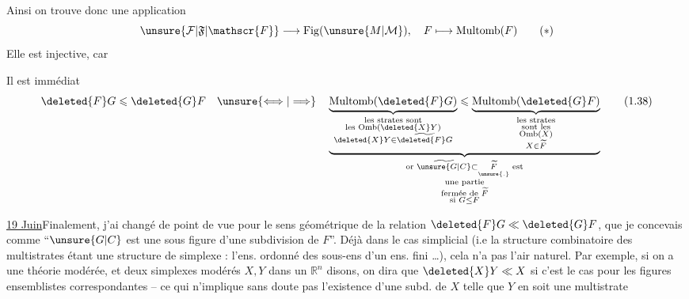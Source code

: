 
Ainsi on trouve donc une application
\[
 \unsure{\mathcal{F}|\mathfrak{F}|\mathscr{F}}\longrightarrow\mathrm{Fig}(\unsure{M|\mathcal{M}}),\quad F\longmapsto\mathrm{Multomb}(F)
 \tag*{$(*)$}
\]
Elle est injective, car 

Il est immédiat
\[
 \deleted{F}G\leqslant\deleted{G}F\quad
 \unsure{\Longleftrightarrow|\Longrightarrow}\quad
 \underbrace{
 \underbrace{\mathrm{Multomb}(\deleted{F}G)}_{
 \substack{\text{les strates sont}\\\text{les }\mathrm{Omb}(\deleted{X}Y)\\\deleted{X}Y\in\widetilde{\deleted{F}G}}}
 \leqslant
 \underbrace{\mathrm{Multomb}(\deleted{G}F)}_{
 \substack{\text{les strates}\\\text{sont les}\\\mathrm{Omb}(X)\\X\in\widetilde F}}}_{
 \substack{\text{or }\widetilde{\unsure{G|C}}\subset\underset{\unsure{.}}{\widetilde F}\text{ est}\\
 \text{une partie}\\\text{fermée de }\widetilde F\\\text{si }G\leq F}}
 \tag*{(1.38)}
\]

\uline{19 Juin}\qquad Finalement, j'ai changé de point de vue pour le sens géométrique de la relation $\deleted{F}G\ll\deleted{G}F$, que je concevais comme ``$\unsure{G|C}$ est une sous figure d'une subdivision de $F$''. Déjà dans  le cas simplicial (i.e la structure combinatoire des  multistrates étant  une structure de simplexe : l'ens. ordonné des sous-ens d'un ens. fini \ldots), cela n'a pas l'air naturel. Par exemple, si on a une théorie modérée, et deux simplexes modérés $X,Y$ dans un $\mathbb{R}^n$ disons, on dira que $\deleted{X}Y\ll X$ si c'est le cas pour les figures ensemblistes correspondantes -- ce qui n'implique sans doute pas l'existence d'une subd. de $X$ telle que $Y$ en soit une multistrate  

